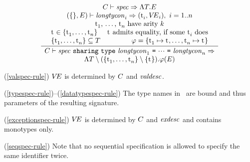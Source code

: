 \begin{equation}		%
\label{sharespec-rule}
\frac{\begin{array}{c}
      \C\ts\spec\ra\sig{\T}{\E} \\
      (\emptymap,\E)\ts\longtycon_i\ra(\t_i,\VE_i),\ i = 1{.}{.} n  \\
      \mbox{$\t_1$, \ldots, $\t_n$ have arity \k}\\
      \begin{array}{lr}
        \t \in \{\t_1, \ldots, \t_n\} &
       \mbox{\t\ admits equality, if some $\t_i$ does} \\
        \{\t_1, \ldots, \t_n\} \subseteq \T &
        \tyrea = \{ \t_1 \mapsto \t, \ldots,
                    \t_n \mapsto \t\}
      \end{array}                    
      \end{array} 
      }
     {\begin{array}{c}
       \C\ts\sharespec\ra \\
       \sig{\T\setminus(\{\t_1, \ldots, \t_n\}\setminus \{\t\})}{\tyrea(\E)}
      \end{array}}
\end{equation}

\comments
\begin{description}
\item{(\ref{valspec-rule})}
   $\mbox{$V\!E$}$ is determined by $C$ and ${\it valdesc}$.
\item{(\ref{typespec-rule})--(\ref{datatypespec-rule})}
   The type names in \T\ are bound and thus parameters of the resulting
   signature.
\item{(\ref{exceptionspec-rule})}
   $\mbox{$V\!E$}$ is determined by $C$ and ${\it exdesc}$ and contains monotypes only.
\item{(\ref{seqspec-rule})}
   Note that no sequential specification is allowed to specify the same 
  identifier twice.   
\end{description} 



